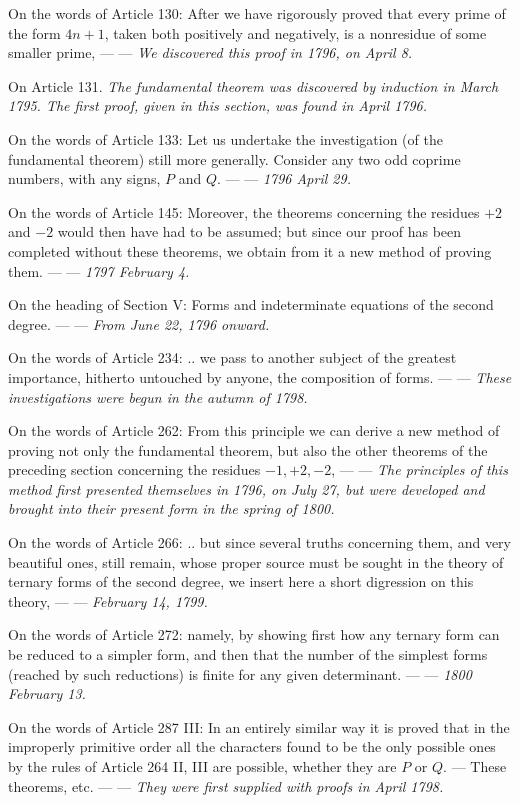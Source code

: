 On the words of Article 130: After we have rigorously proved that every prime of the form \(4n+1\), taken both positively and negatively, is a nonresidue of some smaller prime, — — \textit{We discovered this proof in 1796, on April 8.}


On Article 131. \textit{The fundamental theorem was discovered by induction in March 1795. The first proof, given in this section, was found in April 1796.}



On the words of Article 133: Let us undertake the investigation (of the fundamental theorem) still more generally. Consider any two odd coprime numbers, with any signs, \(P\) and \(Q\). — — \textit{1796 April 29.}


On the words of Article 145: Moreover, the theorems concerning the residues \(+2\) and \(-2\) would then have had to be assumed; but since our proof has been completed without these theorems, we obtain from it a new method of proving them. — — \textit{1797 February 4.}


On the heading of Section V: Forms and indeterminate equations of the second degree. — — \textit{From June 22, 1796 onward.}


On the words of Article 234: .. we pass to another subject of the greatest importance, hitherto untouched by anyone, the composition of forms. — — \textit{These investigations were begun in the autumn of 1798.}


On the words of Article 262: From this principle we can derive a new method of proving not only the fundamental theorem, but also the other theorems of the preceding section concerning the residues \(-1,\allowbreak +2,\allowbreak -2\), — — \textit{The principles of this method first presented themselves in 1796, on July 27, but were developed and brought into their present form in the spring of 1800.}


On the words of Article 266: .. but since several truths concerning them, and very beautiful ones, still remain, whose proper source must be sought in the theory of ternary forms of the second degree, we insert here a short digression on this theory, — — \textit{February 14, 1799.}


On the words of Article 272: namely, by showing first how any ternary form can be reduced to a simpler form, and then that the number of the simplest forms (reached by such reductions) is finite for any given determinant. — — \textit{1800 February 13.}


On the words of Article 287 III: In an entirely similar way it is proved that in the improperly primitive order all the characters found to be the only possible ones by the rules of Article 264 II, III are possible, whether they are \(P\) or \(Q\). — These theorems, etc. — — \textit{They were first supplied with proofs in April 1798.}


